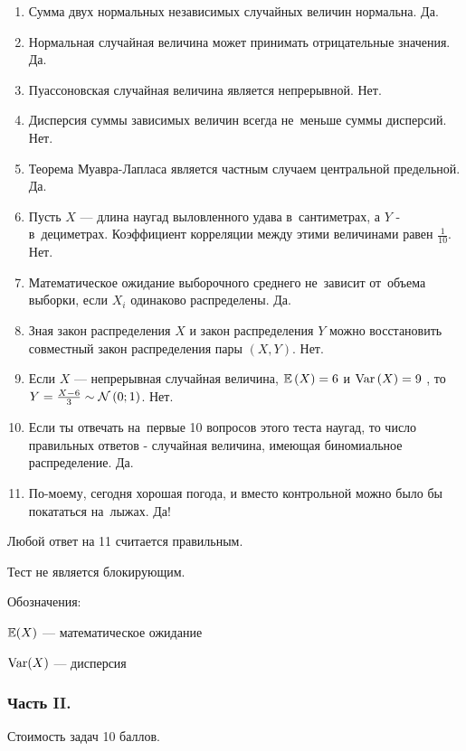 \begin{enumerate}
\item Сумма двух нормальных независимых случайных величин нормальна.
Да.
\item Нормальная случайная величина может принимать отрицательные
значения. Да.
\item Пуассоновская случайная величина является непрерывной. Нет.
\item Дисперсия суммы зависимых величин всегда не~меньше суммы
дисперсий. Нет.
\item Теорема Муавра-Лапласа является частным случаем центральной
предельной. Да.
\item Пусть $X$ — длина наугад выловленного удава в~сантиметрах, а
$Y$ - в~дециметрах. Коэффициент корреляции между этими
величинами равен $\frac{1}{10}$. Нет.
\item Математическое ожидание выборочного среднего не~зависит от~объема
выборки, если $X_{i}$ одинаково распределены. Да.
\item Зная закон распределения $X$ и закон распределения $Y$
можно восстановить совместный закон распределения пары $(X,Y)$. Нет.
\item Если  $X$  — непрерывная случайная величина,  $\mathbb{E}\left(X\right)=6$  и
$\operatorname{Var}\left(X\right)=9$ , то  $Y=\frac{X-6}{3} \sim
\mathcal{N}\left(0;1\right)$.  Нет.
\item Если ты отвечать на~первые 10 вопросов этого теста наугад, то
число правильных ответов - случайная величина, имеющая
биномиальное распределение. Да.
\item По-моему, сегодня хорошая погода, и вместо контрольной можно
было бы покататься на~лыжах. Да!
\end{enumerate}


Любой ответ на 11 считается правильным.

Тест не является блокирующим.

Обозначения:

$\mathbb{E}(X)$ — математическое ожидание

$\operatorname{Var}(X)$ — дисперсия

\subsubsection*{Часть II.}

Стоимость задач 10 баллов.

